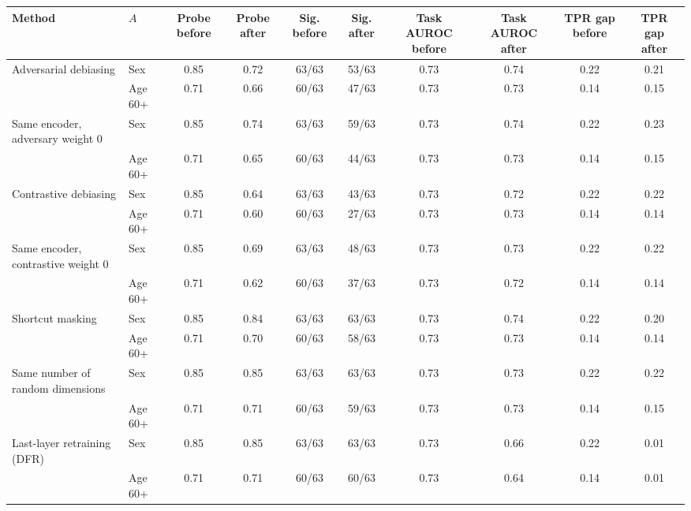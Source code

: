 \begin{tabular}{llcccccccc}
\toprule
Method & $A$ & Probe before & Probe after & Sig. before & Sig. after & Task AUROC before & Task AUROC after & TPR gap before & TPR gap after \\
\midrule
Adversarial debiasing & Sex & 0.85 & 0.72 & 63/63 & 53/63 & 0.73 & 0.74 & 0.22 & 0.21 \\
 & Age 60+ & 0.71 & 0.66 & 60/63 & 47/63 & 0.73 & 0.73 & 0.14 & 0.15 \\
\midrule
Same encoder, adversary weight 0 & Sex & 0.85 & 0.74 & 63/63 & 59/63 & 0.73 & 0.74 & 0.22 & 0.23 \\
 & Age 60+ & 0.71 & 0.65 & 60/63 & 44/63 & 0.73 & 0.73 & 0.14 & 0.15 \\
\midrule
Contrastive debiasing & Sex & 0.85 & 0.64 & 63/63 & 43/63 & 0.73 & 0.72 & 0.22 & 0.22 \\
 & Age 60+ & 0.71 & 0.60 & 60/63 & 27/63 & 0.73 & 0.73 & 0.14 & 0.14 \\
\midrule
Same encoder, contrastive weight 0 & Sex & 0.85 & 0.69 & 63/63 & 48/63 & 0.73 & 0.73 & 0.22 & 0.22 \\
 & Age 60+ & 0.71 & 0.62 & 60/63 & 37/63 & 0.73 & 0.72 & 0.14 & 0.14 \\
\midrule
Shortcut masking & Sex & 0.85 & 0.84 & 63/63 & 63/63 & 0.73 & 0.74 & 0.22 & 0.20 \\
 & Age 60+ & 0.71 & 0.70 & 60/63 & 58/63 & 0.73 & 0.73 & 0.14 & 0.14 \\
\midrule
Same number of random dimensions & Sex & 0.85 & 0.85 & 63/63 & 63/63 & 0.73 & 0.73 & 0.22 & 0.22 \\
 & Age 60+ & 0.71 & 0.71 & 60/63 & 59/63 & 0.73 & 0.73 & 0.14 & 0.15 \\
\midrule
Last-layer retraining (DFR) & Sex & 0.85 & 0.85 & 63/63 & 63/63 & 0.73 & 0.66 & 0.22 & 0.01 \\
 & Age 60+ & 0.71 & 0.71 & 60/63 & 60/63 & 0.73 & 0.64 & 0.14 & 0.01 \\
\bottomrule
\end{tabular}
